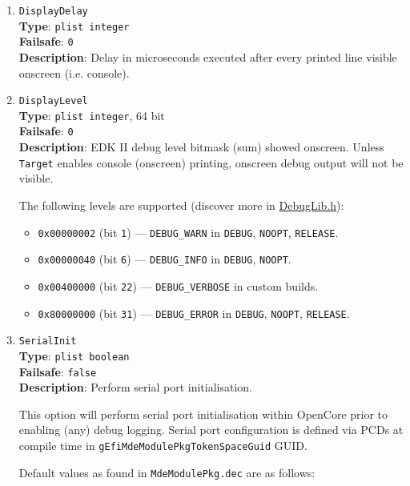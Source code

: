 \documentclass[]{article}
\providecommand{\tightlist}{%
  \setlength{\itemsep}{0pt}\setlength{\parskip}{0pt}}
\begin{document}
\begin{enumerate}
\item
  \texttt{DisplayDelay}\\
  \textbf{Type}: \texttt{plist\ integer}\\
  \textbf{Failsafe}: \texttt{0}\\
  \textbf{Description}: Delay in microseconds executed after
  every printed line visible onscreen (i.e. console).

\item
  \texttt{DisplayLevel}\\
  \textbf{Type}: \texttt{plist\ integer}, 64 bit\\
  \textbf{Failsafe}: \texttt{0}\\
  \textbf{Description}: EDK II debug level bitmask (sum) showed onscreen.
  Unless \texttt{Target} enables console (onscreen) printing,
  onscreen debug output will not be visible.

  The following levels are supported (discover more in
  \href{https://github.com/acidanthera/audk/blob/master/MdePkg/Include/Library/DebugLib.h}{DebugLib.h}):

  \begin{itemize}
  \tightlist
    \item \texttt{0x00000002} (bit \texttt{1}) --- \texttt{DEBUG\_WARN} in \texttt{DEBUG},
      \texttt{NOOPT}, \texttt{RELEASE}.
    \item \texttt{0x00000040} (bit \texttt{6}) --- \texttt{DEBUG\_INFO} in \texttt{DEBUG},
      \texttt{NOOPT}.
    \item \texttt{0x00400000} (bit \texttt{22}) --- \texttt{DEBUG\_VERBOSE} in custom builds.
    \item \texttt{0x80000000} (bit \texttt{31}) --- \texttt{DEBUG\_ERROR} in \texttt{DEBUG},
      \texttt{NOOPT}, \texttt{RELEASE}.
  \end{itemize}

\item
  \texttt{SerialInit}\\
  \textbf{Type}: \texttt{plist\ boolean}\\
  \textbf{Failsafe}: \texttt{false}\\
  \textbf{Description}: Perform serial port initialisation.

  This option will perform serial port initialisation within OpenCore prior to enabling
  (any) debug logging. Serial port configuration is defined via PCDs at compile time
  in \texttt{gEfiMdeModulePkgTokenSpaceGuid} GUID.

  Default values as found in \texttt{MdeModulePkg.dec} are as follows:


\end{enumerate}
\end{document}
